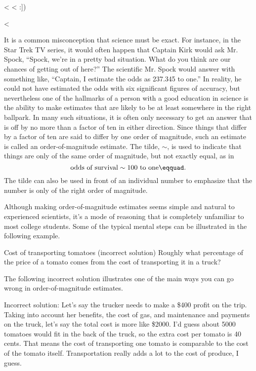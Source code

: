 <%
<%
:])%


<%


It is a common misconception that science must be exact. For
instance, in the Star Trek TV series, it would often happen
that Captain Kirk would ask Mr. Spock, ``Spock, we're in a
pretty bad situation. What do you think are our chances of
getting out of here?'' The scientific Mr. Spock would answer
with something like, ``Captain, I estimate the odds as
237.345 to one.'' In reality, he could not have estimated
the odds with six significant figures of accuracy, but
nevertheless one of the hallmarks of a person with a good
education in science is the ability to make estimates that
are likely to be at least somewhere in the right ballpark.
In many such situations, it is often only necessary to get
an answer that is off by no more than a factor of ten in
either direction. Since things that differ by a factor of
ten are said to differ by one order of magnitude, such an
estimate is called an order-of-magnitude estimate. The
tilde, $\sim$, is used to indicate that things are only of
the same order of magnitude, but not exactly equal, as in
\begin{equation*}
  \text{odds of survival} \sim \text{100 to one}\eqquad.
\end{equation*}
The tilde can also be used in front of an individual number
to emphasize that the number is only of the right order of magnitude.

Although making order-of-magnitude estimates seems simple
and natural to experienced scientists, it's a mode of
reasoning that is completely unfamiliar to most college
students. Some of the typical mental steps can be illustrated
in the following example.

\begin{eg}{Cost of transporting tomatoes (incorrect solution)}
\egquestion Roughly what percentage of the price of a tomato
comes from the cost of transporting it in a truck?

\eganswer The following incorrect solution illustrates one of the main
ways you can go wrong in order-of-magnitude estimates.

Incorrect solution: Let's say the trucker needs to make a
\$400 profit on the trip. Taking into account her benefits,
the cost of gas, and maintenance and payments on the truck,
let's say the total cost is more like \$2000. I'd guess
about 5000 tomatoes would fit in the back of the truck, so
the extra cost per tomato is 40 cents. That means the cost
of transporting one tomato is comparable to the cost of the
tomato itself. Transportation really adds a lot to the cost
of produce, I guess.
\end{eg}

